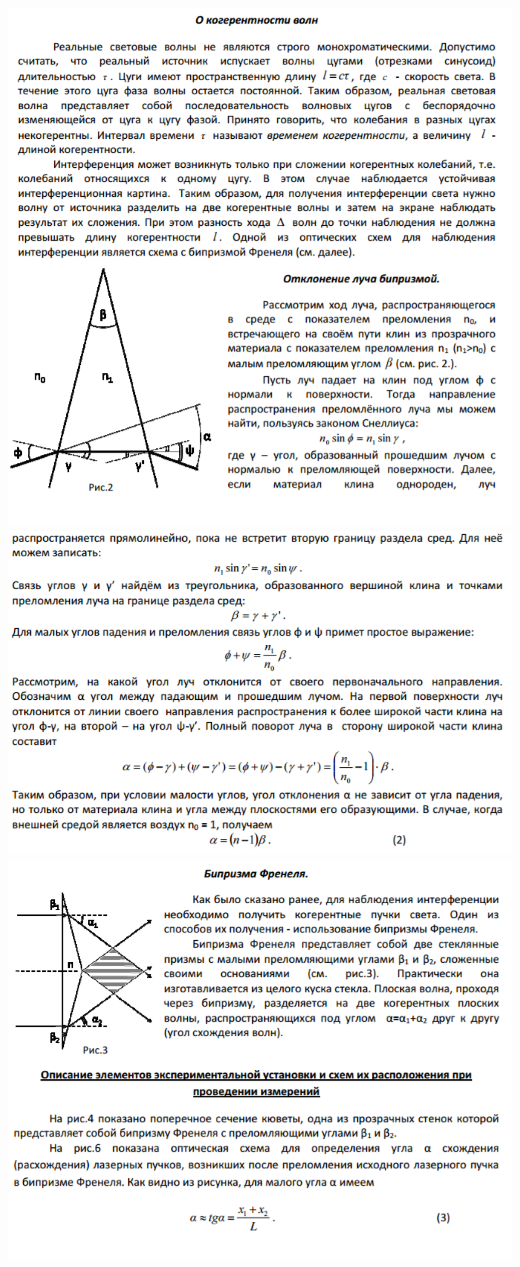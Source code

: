 \documentclass[12pt]{article}
\begin{document}
\begin{center}
    	\includegraphics[width=15cm]{theory3.png}\\
    	\includegraphics[width=16cm]{theory4.png}\\
    	\includegraphics[width=16cm]{theory5.png}\\

\end{center}
\end{document}
